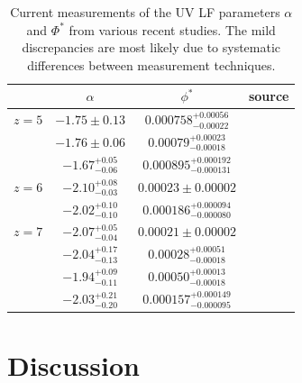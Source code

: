 \documentclass[useAMS,usenatbib]{mn2e}
\begin{document}
\begin{table}
\centering
\begin{tabular}{l c c c}
 &$\alpha$ & $\phi^*$ & source \\
\hline
$z=5$ & $-1.75 \pm 0.13$ & $0.000758^{+0.00056}_{-0.00022}$ & \citet{Mason15} \\
& $-1.76 \pm 0.06$ & $0.00079^{+0.00023}_{-0.00018}$ & \citet{Bouwens15} \\
& $-1.67^{+0.05}_{-0.06}$&$0.000895^{+0.000192}_{-0.000131}$&\citet{Finkelstein15}\\
\hline
$z=6$ & $-2.10^{+0.08}_{-0.03}$&$0.00023\pm0.00002$&\citet{Livermore17} \\
& $-2.02^{+0.10}_{-0.10}$&$0.000186^{+0.000094}_{-0.000080}$&\citet{Finkelstein15}\\
\hline
$z=7$ & $-2.07^{+0.05}_{-0.04}$&$0.00021\pm0.00002$&\citet{Livermore17} \\
&$-2.04^{+0.17}_{-0.13}$&$0.00028^{+0.00051}_{-0.00018}$&\citet{Atek15} \\
&$-1.94^{+0.09}_{-0.11}$&$0.00050^{+0.00013}_{-0.00018}$&\citet{Ishigaki15} \\
& $-2.03^{+0.21}_{-0.20}$&$0.000157^{+0.000149}_{-0.000095}$&\citet{Finkelstein15}\\
\hline
\end{tabular}
\caption{Current measurements of the UV LF parameters $\alpha$ and $\Phi^*$ from various recent studies. The mild discrepancies are most likely due to systematic differences between measurement techniques.}
\end{table}



\section{Discussion}
\end{document}
